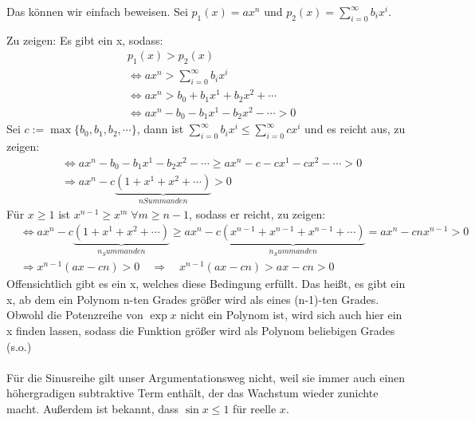 \documentclass[a4paper,german,12pt,smallheadings]{scrartcl}
\begin{document}
Das können wir einfach beweisen. Sei $p_1(x)=ax^n$ und $p_2(x)=\sum\limits_{i=0}^{\infty} b_i x^i$.

Zu zeigen: Es gibt ein x, sodass:
\begin{align*}
  &p_1(x)>p_2(x)\\
  & \Leftrightarrow ax^n>\sum\limits_{i=0}^{\infty} b_i x^i\\
  & \Leftrightarrow ax^n>b_0+b_1x^1+b_2x^2+ \cdots\\
  & \Leftrightarrow ax^n-b_0-b_1x^1-b_2x^2- \cdots >0
\end{align*}
Sei $c:=\max\{b_0,b_1,b_2,\cdots\}$, dann ist $\sum\limits_{i=0}^{\infty} b_i x^i \leq \sum\limits_{i=0}^{\infty} c x^i$ und es reicht aus, zu zeigen:
\begin{align*}
  & \Leftrightarrow ax^n-b_0-b_1x^1-b_2x^2- \cdots \geq ax^n-c-cx^1-cx^2- \cdots>0\\
  & \Rightarrow ax^n-c\underbrace{\left(1+x^1+x^2+\cdots \right)}_{n Summanden}>0
\end{align*}
Für $x \geq 1$ ist $x^{n-1} \geq x^m \; \forall m \geq n-1$, sodass er reicht, zu zeigen:
\begin{align*}
  & \Leftrightarrow ax^n-c\underbrace{\left(1+x^1+x^2+\cdots \right)}_{n_Summanden} \geq ax^n-c\underbrace{\left(x^{n-1}+x^{n-1}+x^{n-1}+\cdots \right)}_{n_Summanden} = ax^n-cnx^{n-1} > 0\\
  & \Rightarrow x^{n-1}\left(ax-cn\right)>0 \quad \Rightarrow \quad x^{n-1}\left(ax-cn\right)>ax-cn>0
\end{align*}
Offensichtlich gibt es ein x, welches diese Bedingung erfüllt. Das heißt, es gibt ein x, ab dem ein Polynom n-ten Grades größer wird als eines (n-1)-ten Grades.\\
Obwohl die Potenzreihe von $\exp x$ nicht ein Polynom ist, wird sich auch hier ein x finden lassen, sodass die Funktion größer wird als Polynom beliebigen Grades (s.o.) \\
\\
Für die Sinusreihe gilt unser Argumentationsweg nicht, weil sie immer auch einen
höhergradigen subtraktive Term enthält, der das Wachstum wieder zunichte macht.
Außerdem ist bekannt, dass $\sin x \le 1$ für reelle $x$.
\end{document}

